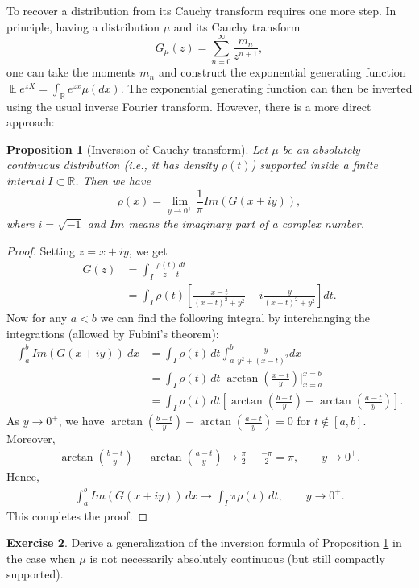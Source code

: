 \documentclass[letterpaper,11pt,oneside,reqno]{amsart}
\numberwithin{equation}{section}
\DeclareMathOperator{\EE}{\mathbb{E}}
\newtheorem{proposition}{Proposition}[section]
\theoremstyle{definition}
\newtheorem{exercise}[proposition]{Exercise}
\begin{document}
To recover a distribution from its Cauchy transform requires one more step. In principle, 
having a distribution $\mu$ and its Cauchy transform
\begin{equation}
	G_\mu(z)=\sum_{n=0}^{\infty}\frac{m_n}{z^{n+1}},
\end{equation}
one can take the moments $m_n$ and construct the exponential generating function $\EE e^{zX}=\int_{\mathbb{R}}e^{zx}\mu(dx)$.
The exponential generating function can then be inverted using the usual inverse Fourier transform.
However, there is a more direct approach:
\begin{proposition}[Inversion of Cauchy transform]\label{prop:inverse_Cauchy}
	Let $\mu$ be an absolutely continuous distribution (i.e., it has density $\rho(t)$) supported 
	inside a finite interval $I\subset\mathbb{R}$.
	Then we have 
	\begin{equation*}
		\rho(x)=\lim_{y\to0^{+}}\frac{1}{\pi}Im(G(x+iy)),
	\end{equation*}
	where $i=\sqrt{-1}$ and $Im$ means the imaginary part of a complex number.
\end{proposition}
\begin{proof}
	Setting $z=x+iy$, we get
	\begin{align*}
	 G(z)&=\int_I \frac{\rho(t)\, dt}{z-t}\\
	 &= \int_I \rho(t)\left[\frac{x-t}{(x-t)^2+y^2}-i\frac{y}{(x-t)^2+y^2}\right] dt.
	\end{align*}
	Now for any $a<b$ we can find the following integral
	by interchanging the integrations
	(allowed by Fubini's theorem):
	\begin{align*}
	 \int_a^b Im(G(x+iy)) \ dx&= \int_I\rho(t)\, dt\int_a^b \frac{-y}{y^2+(x-t)^2} dx\\
	 &=\int_I\rho(t)\, dt\;\arctan\left(\frac{x-t}{y}\right)\bigg\vert_{x=a}^{x=b}\\
	 &=\int_I\rho(t)\, dt\left[\arctan\left(\frac{b-t}{y}\right)-\arctan\left(\frac{a-t}{y}\right)\right].
	\end{align*}
	As $y\to0^+$, we have
	$\arctan\left(\frac{b-t}{y}\right)-\arctan\left(\frac{a-t}{y}\right)=0$ for $t\notin[a,b]$.
	Moreover, 
	\begin{align*}
	\arctan\left(\frac{b-t}{y}\right)-\arctan\left(\frac{a-t}{y}\right)\to \frac{\pi}{2}-\frac{-\pi}{2}=\pi,\qquad y\to0^+.
	\end{align*}
	Hence,
	\begin{align*}
	 \int_a^b Im(G(x+iy)) \, dx\to \int_I \pi\rho(t)\, dt,\qquad {y\to 0^+}.
	\end{align*}
	This completes the proof.
\end{proof}
\begin{exercise}
	Derive a generalization of the inversion formula of Proposition \ref{prop:inverse_Cauchy}
	in the case when $\mu$ is not necessarily absolutely continuous (but still compactly supported).
\end{exercise}
\end{document}
